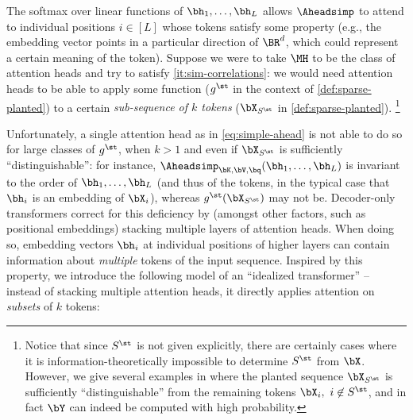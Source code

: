 \documentclass{article}
\newcommand{\arxiv}[1]{\iftoggle{icml}{}{#1}}
\newcommand{\icml}[1]{\iftoggle{icml}{#1}{}}
\begin{document}
\icml{where $\alpha = \softmax(\langle \bq, \bK \bh_1 \rangle, \ldots, \langle \bq, \bK \bh_L \rangle)$.} 
The softmax over linear functions of $\bh_1, \ldots, \bh_L$ allows $\Aheadsimp$ to attend to individual positions $i \in [L]$ whose tokens satisfy some property{ (e.g., the embedding vector points in a particular direction of $\BR^d$, which could represent a certain meaning of the token)}. %
Suppose we were to take $\MH$ to be the class of attention heads and try to satisfy \cref{it:sim-correlations}: we would need attention heads to be able to apply some function ($g^\st$ in the context of \cref{def:sparse-planted}) to a certain \emph{sub-sequence of $k$ tokens} ($\bX_{S^\st}$ in \cref{def:sparse-planted}).%
\footnote{
  Notice that since $S^\st$ is not given explicitly, there are certainly cases where it is information-theoretically impossible to determine $S^\st$ from $\bX$. However, we give several examples in \arxiv{\cref{sec:lower-bounds}}\icml{\cref{sec:basic-setup-appendix,sec:lower-bounds}} where the planted sequence $\bX_{S^\st}$ is sufficiently ``distinguishable'' from the remaining tokens $\bX_i,\ i \not \in S^\st$, and in fact $\bY$ can indeed be computed with high probability.
 }

Unfortunately, a single attention head as in \cref{eq:simple-ahead} is not able to do so for large classes of $g^\st$, when $k > 1$ and even if $\bX_{S^\st}$ is sufficiently ``distinguishable'': for instance, $\Aheadsimp_{\bK, \bV, \bq}(\bh_1, \ldots, \bh_L)$ is invariant to the order of $\bh_1, \ldots, \bh_L$ (and thus of the tokens, in the typical case that $\bh_i$ is an embedding of $\bX_i$), whereas $g^\st(\bX_{S^\st})$ may not be.\arxiv{

} Decoder-only transformers correct for this deficiency by (amongst other factors, such as positional embeddings) stacking multiple layers of attention heads. When doing so, embedding vectors $\bh_i$ at individual positions of higher layers can contain information about \emph{multiple} tokens of the input sequence. %
Inspired by this property, we introduce the following model of an ``idealized transformer'' -- instead of stacking multiple attention heads, it directly applies attention on \emph{subsets} of $k$ tokens: 
\end{document}
